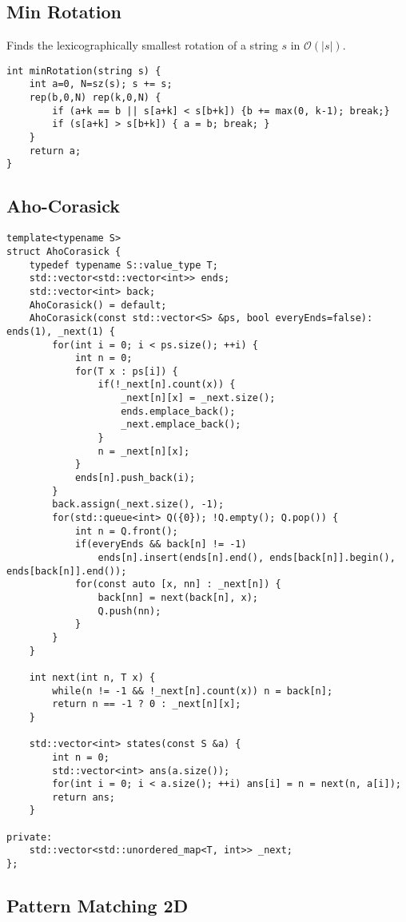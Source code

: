 \documentclass[a4paper,9pt]{article}
\begin{document}
\subsection{Min Rotation}

Finds the lexicographically smallest rotation of a string $s$ in $\mathcal{O}(|s|)$.
\begin{lstlisting}
int minRotation(string s) {
	int a=0, N=sz(s); s += s;
	rep(b,0,N) rep(k,0,N) {
		if (a+k == b || s[a+k] < s[b+k]) {b += max(0, k-1); break;}
		if (s[a+k] > s[b+k]) { a = b; break; }
	}
	return a;
}
\end{lstlisting}

\subsection{Aho-Corasick}

\begin{lstlisting}
template<typename S>
struct AhoCorasick {
	typedef typename S::value_type T;
	std::vector<std::vector<int>> ends;
	std::vector<int> back;
	AhoCorasick() = default;
	AhoCorasick(const std::vector<S> &ps, bool everyEnds=false): ends(1), _next(1) {
		for(int i = 0; i < ps.size(); ++i) {
			int n = 0;
			for(T x : ps[i]) {
				if(!_next[n].count(x)) {
					_next[n][x] = _next.size();
					ends.emplace_back();
					_next.emplace_back();
				}
				n = _next[n][x];
			}
			ends[n].push_back(i);
		}
		back.assign(_next.size(), -1);
		for(std::queue<int> Q({0}); !Q.empty(); Q.pop()) {
			int n = Q.front();
			if(everyEnds && back[n] != -1)
				ends[n].insert(ends[n].end(), ends[back[n]].begin(), ends[back[n]].end());
			for(const auto [x, nn] : _next[n]) {
				back[nn] = next(back[n], x);
				Q.push(nn);
			}
		}
	}
	
	int next(int n, T x) {
		while(n != -1 && !_next[n].count(x)) n = back[n];
		return n == -1 ? 0 : _next[n][x];
	}
	
	std::vector<int> states(const S &a) {
		int n = 0;
		std::vector<int> ans(a.size());
		for(int i = 0; i < a.size(); ++i) ans[i] = n = next(n, a[i]);
		return ans;
	}
	
private:
	std::vector<std::unordered_map<T, int>> _next;
};
\end{lstlisting}

\subsection{Pattern Matching 2D}
\end{document}
